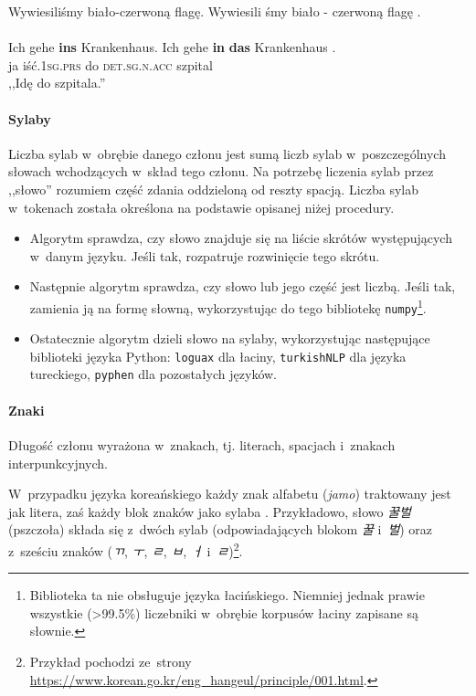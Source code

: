 \begin{exe}
\ex \label{biało-czerwona}
Wywiesiliśmy biało-czerwoną flagę.
\gll Wywiesili śmy biało - czerwoną flagę . \\ \\

\ex \label{krankenhaus}
Ich gehe \textbf{ins} Krankenhaus.
\gll Ich gehe \textbf{in} \textbf{das} Krankenhaus . \\
ja iść\textsc{.1sg.prs} do \textsc{det.sg.n.acc} szpital \\
\glt ,,Idę do szpitala.''
\end{exe}

\paragraph{Sylaby}
Liczba sylab w~obrębie danego członu jest sumą liczb sylab w~poszczególnych słowach wchodzących w~skład tego członu. Na potrzebę liczenia sylab przez ,,słowo'' rozumiem część zdania oddzieloną od reszty spacją. Liczba sylab w~tokenach została określona na podstawie opisanej niżej procedury.

\begin{itemize}

\item Algorytm sprawdza, czy słowo znajduje się na liście skrótów występujących w~danym języku. Jeśli tak, rozpatruje rozwinięcie tego skrótu.
\item Następnie algorytm sprawdza, czy słowo lub jego część jest liczbą. Jeśli tak, zamienia ją na formę słowną, wykorzystując do tego bibliotekę \texttt{numpy}\footnote{
Biblioteka ta nie obsługuje języka łacińskiego. Niemniej jednak prawie wszystkie (>99.5\%) liczebniki w~obrębie korpusów łaciny zapisane są słownie.}.
\item Ostatecznie algorytm dzieli słowo na sylaby, wykorzystując następujące biblioteki języka Python:
\subitem \texttt{loguax} dla łaciny,
\subitem \texttt{turkishNLP} dla języka tureckiego,
\subitem \texttt{pyphen} dla pozostałych języków.
\end{itemize}

\paragraph{Znaki}
Długość członu wyrażona w~znakach, tj. literach, spacjach i~znakach interpunkcyjnych. 


W~przypadku języka koreańskiego każdy znak alfabetu (\textit{jamo}) traktowany jest jak litera, zaś każdy blok znaków jako sylaba \citep{simpson2004syllable}. Przykładowo, słowo \textit{꿀벌} (pszczoła) składa się z~dwóch sylab (odpowiadających blokom \textit{꿀} i~\textit{벌}) oraz z~sześciu znaków (\textit{ㄲ}, \textit{ㅜ}, \textit{ㄹ}, \textit{ㅂ}, \textit{ㅓ} i~\textit{ㄹ})\footnote{Przykład pochodzi ze~strony \url{https://www.korean.go.kr/eng_hangeul/principle/001.html}.}.

